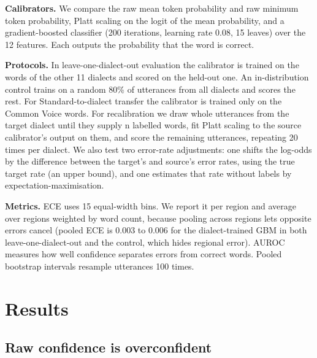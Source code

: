 \documentclass[10pt]{article}
\begin{document}
\textbf{Calibrators.} We compare the raw mean token probability and raw minimum token probability, Platt scaling on the logit of the mean probability, and a gradient-boosted classifier (200 iterations, learning rate 0.08, 15 leaves) over the 12 features. Each outputs the probability that the word is correct.


\textbf{Protocols.} In leave-one-dialect-out evaluation the calibrator is trained on the words of the other 11 dialects and scored on the held-out one. An in-distribution control trains on a random 80\% of utterances from all dialects and scores the rest. For Standard-to-dialect transfer the calibrator is trained only on the Common Voice words. For recalibration we draw whole utterances from the target dialect until they supply n labelled words, fit Platt scaling to the source calibrator's output on them, and score the remaining utterances, repeating 20 times per dialect. We also test two error-rate adjustments: one shifts the log-odds by the difference between the target's and source's error rates, using the true target rate (an upper bound), and one estimates that rate without labels by expectation-maximisation.


\textbf{Metrics.} ECE uses 15 equal-width bins. We report it per region and average over regions weighted by word count, because pooling across regions lets opposite errors cancel (pooled ECE is 0.003 to 0.006 for the dialect-trained GBM in both leave-one-dialect-out and the control, which hides regional error). AUROC measures how well confidence separates errors from correct words. Pooled bootstrap intervals resample utterances 100 times.


\section{Results}

\subsection{Raw confidence is overconfident}
\end{document}
